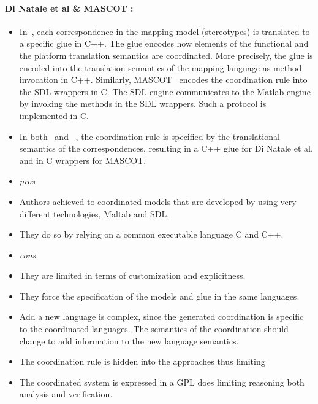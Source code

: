 \paragraph{Di Natale et al \& MASCOT :}
\begin{itemize}
	
	\item In~\cite{dinatale}, each correspondence in the mapping model (\ie stereotypes) is translated to a specific glue in C++. The glue encodes how elements of the functional and the platform translation semantics are coordinated. More precisely, the glue is encoded into the translation semantics of the mapping language as method invocation in C++. Similarly, MASCOT~\cite{mascotbib} encodes the coordination rule into the SDL wrappers in C. The SDL engine communicates to the Matlab engine by invoking the methods in the SDL wrappers. Such a protocol is implemented in C. 
	
	\item In both~\cite{dinatale} and ~\cite{mascotbib}, the coordination rule is specified by the translational semantics of the correspondences, \ie resulting in a C++ glue for Di Natale et al. and in C wrappers for MASCOT.
	
	\item \emph{pros} 
	\item Authors achieved to coordinated models that are developed by using very different technologies, \ie Maltab and SDL.
	
	\item They do so by relying on a common executable language \ie C and C++.
	  
	  
	\item \emph{cons} 
	
	\item They are limited in terms of customization and explicitness. 
	 
	\item They force the specification of the models and glue in the same languages. 
	
	\item Add a new language is complex, since the generated coordination is specific to the coordinated languages. The semantics of the coordination should change to add information to the new language semantics. 
	
	\item The coordination rule is hidden into the approaches thus limiting  
	
	\item The coordinated system is expressed in a GPL does limiting reasoning both analysis and verification. 
	
\end{itemize} 
